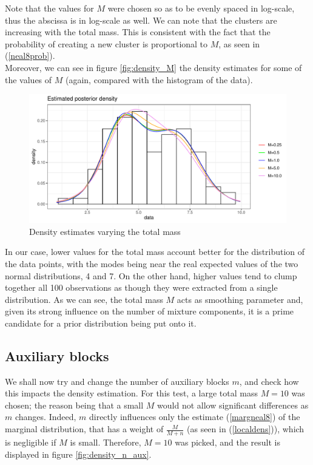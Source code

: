 Note that the values for $M$ were chosen so as to be evenly spaced in log-scale, thus the abscissa is in log-scale as well.
We can note that the clusters are increasing with the total mass.
This is consistent with the fact that the probability of creating a new cluster is proportional to $M$, as seen in (\ref{neal8prob}). \\
Moreover, we can see in figure \ref{fig:density_M} the density estimates for some of the values of $M$ (again, compared with the histogram of the data).

\clearpage

\begin{figure}[h]
	\centering
	\includegraphics[scale=0.5]{etc/dens_withMm3.pdf}
	\caption{Density estimates varying the total mass}

	\label{fig:density_total_mass}
\end{figure}


In our case, lower values for the total mass account better for the distribution of the data points, with the modes being near the real expected values of the two normal distributions, 4 and 7.
On the other hand, higher values tend to clump together all 100 observations as though they were extracted from a single distribution.
As we can see, the total mass $M$ acts as smoothing parameter and, given its strong influence on the number of mixture components, it is a prime candidate for a prior distribution being put onto it.



\subsection{Auxiliary blocks}
We shall now try and change the number of auxiliary blocks $m$, and check how this impacts the density estimation.
For this test, a large total mass $M=10$ was chosen; the reason being that a small $M$ would not allow significant differences as $m$ changes.
Indeed, $m$ directly influences only the estimate (\ref{margneal8}) of the marginal distribution, that has a weight of $\frac{M}{M+n}$ (as seen in (\ref{localdens})), which is negligible if $M$ is small.
Therefore, $M=10$ was picked, and the result is displayed in figure \ref{fig:density_n_aux}.



